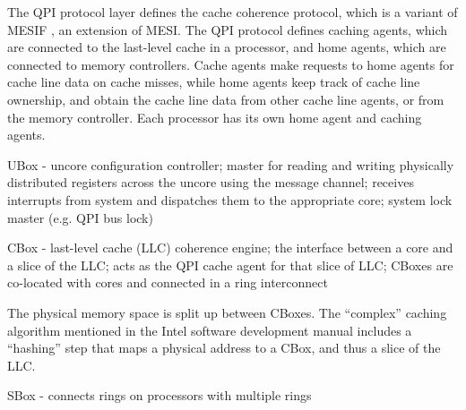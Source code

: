 The QPI protocol layer defines the cache coherence protocol, which is a variant
of MESIF \cite{goodman2009mesif}, an extension of MESI. The QPI protocol
defines caching agents, which are connected to the last-level cache in a
processor, and home agents, which are connected to memory controllers. Cache
agents make requests to home agents for cache line data on cache misses, while
home agents keep track of cache line ownership, and obtain the cache line data
from other cache line agents, or from the memory controller. Each processor has
its own home agent and caching agents.

UBox - uncore configuration controller; master for reading and writing
physically distributed registers across the uncore using the message
channel; receives interrupts from system and dispatches them to the
appropriate core; system lock master (e.g. QPI bus lock)

CBox - last-level cache (LLC) coherence engine; the interface between a core
and a slice of the LLC; acts as the QPI cache agent for that slice of LLC;
CBoxes are co-located with cores and connected in a ring interconnect

The physical memory space is split up between CBoxes. The ``complex'' caching
algorithm mentioned in the Intel software development manual
\cite{intel2014manual} includes a ``hashing'' step that maps a physical address
to a CBox, and thus a slice of the LLC.

SBox - connects rings on processors with multiple rings

